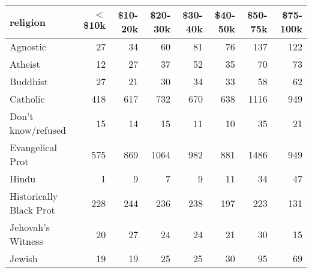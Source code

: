 \begin{tabular}{lrrrrrrr}
  \toprule
 religion & $<$\$10k & \$10-20k & \$20-30k & \$30-40k & \$40-50k & \$50-75k & \$75-100k \\ 
  \midrule
  Agnostic &  27 &  34 &  60 &  81 &  76 & 137 & 122 \\ 
  Atheist &  12 &  27 &  37 &  52 &  35 &  70 &  73 \\ 
  Buddhist &  27 &  21 &  30 &  34 &  33 &  58 &  62 \\ 
  Catholic & 418 & 617 & 732 & 670 & 638 & 1116 & 949 \\ 
  Don’t know/refused &  15 &  14 &  15 &  11 &  10 &  35 &  21 \\ 
  Evangelical Prot & 575 & 869 & 1064 & 982 & 881 & 1486 & 949 \\ 
  Hindu &   1 &   9 &   7 &   9 &  11 &  34 &  47 \\ 
  Historically Black Prot & 228 & 244 & 236 & 238 & 197 & 223 & 131 \\ 
  Jehovah's Witness &  20 &  27 &  24 &  24 &  21 &  30 &  15 \\ 
  Jewish &  19 &  19 &  25 &  25 &  30 &  95 &  69 \\ 
   \bottomrule
\end{tabular}
